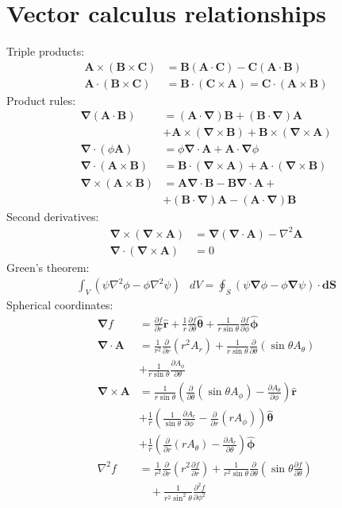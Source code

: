 \documentclass[10pt,twocolumn]{article}
\newcommand{\D}{\mathbf{\nabla}}
\newcommand{\A}{\mathbf{A}}
\newcommand{\B}{\mathbf{B}}
\newcommand{\C}{\mathbf{C}}
\newcommand{\dS}{\mathbf{dS}}
\newcommand{\laplacian}{\nabla^2}
\newcommand{\rhat}{\mathbf{\hat{r}}}
\newcommand{\thetahat}{\mathbf{\hat{\theta}}}
\newcommand{\phihat}{\mathbf{\hat{\phi}}}
\begin{document}
  \section{Vector calculus relationships}
  Triple products:
  \begin{align*}
    \A\times(\B\times\C) &= \B(\A\cdot\C) - \C(\A\cdot\B) \\
    \A\cdot(\B\times\C) &= \B\cdot(\C\times\A) = \C\cdot(\A\times\B)
  \end{align*}
  Product rules:
  \begin{align*}
    \D(\A\cdot\B) &= (\A\cdot\D)\B+(\B\cdot\D)\A \\
    &+\A\times(\D\times\B)+\B\times(\D\times\A) \\
    \D\cdot(\phi\A) &= \phi\D\cdot\A + \A\cdot\D\phi \\
    \D\cdot(\A\times\B) &= \B\cdot(\D\times\A) + \A\cdot(\D\times\B) \\
    \D\times(\A\times\B) &= \A\D\cdot\B - \B\D\cdot\A + \\
    &+ (\B\cdot\D)\A - (\A\cdot\D)\B
  \end{align*}
  Second derivatives:
  \begin{align*}
    \D\times(\D\times\A) &= \D(\D\cdot\A) - \laplacian\A \\
    \D\cdot(\D\times\A) &=0
  \end{align*}
  Green's theorem:
  \begin{align*}
    \int_V\left(\psi\laplacian\phi-\phi\laplacian\psi\right)&dV
    = \oint_S\left(\psi\D\phi - \phi\D\psi\right)\cdot\dS
  \end{align*}
  Spherical coordinates:
  \begin{align*}
    \D f &= \frac{\partial f}{\partial r}\rhat
    + \frac1r\frac{\partial f}{\partial\theta}\thetahat
    + \frac1{r\sin\theta}\frac{\partial f}{\partial\phi}\phihat \\
    \D\cdot\A &= \frac1{r^2}\frac{\partial}{\partial r}
          \left(r^2A_r\right)
    + \frac1{r\sin\theta}\frac{\partial}{\partial\theta}
          \left(\sin\theta A_\theta\right) \\
    &+ \frac1{r\sin\theta}\frac{\partial A_\phi}{\partial\theta} \\
    \D\times\A &=
    \frac1{r\sin\theta} \left(
         \frac{\partial}{\partial\theta}\left(\sin\theta A_\phi\right)
         - \frac{\partial A_\theta}{\partial\phi}
    \right) \rhat \\
    &+ \frac1r\left(
         \frac1{\sin\theta}\frac{\partial A_r}{\partial \phi}
         - \frac{\partial}{\partial r}\left(rA_\phi\right)
    \right)\thetahat \\
    &+ \frac1r\left(
         \frac{\partial}{\partial r}\left(rA_\theta\right)
         -\frac{\partial A_r}{\partial\theta}
    \right)\phihat
    \\
    \laplacian f &=
    \frac1{r^2}\frac{\partial}{\partial r}\left(r^2\frac{\partial
    f}{\partial r}\right)
    + \frac1{r^2\sin\theta}\frac{\partial}{\partial\theta}
      \left(\sin\theta\frac{\partial f}{\partial\theta}\right)\\
    &\quad+ \frac1{r^2\sin^2\theta}\frac{\partial^2f}{\partial\phi^2}
  \end{align*}
\end{document}
